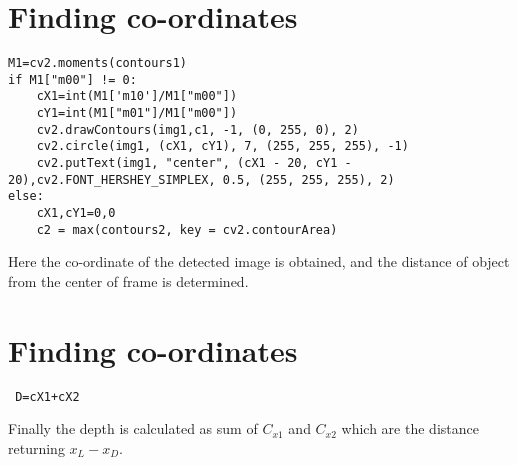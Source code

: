 \section{Finding co-ordinates}
\begin{lstlisting}
M1=cv2.moments(contours1)
if M1["m00"] != 0:
	cX1=int(M1['m10']/M1["m00"])
	cY1=int(M1["m01"]/M1["m00"])
	cv2.drawContours(img1,c1, -1, (0, 255, 0), 2)
	cv2.circle(img1, (cX1, cY1), 7, (255, 255, 255), -1)
	cv2.putText(img1, "center", (cX1 - 20, cY1 - 20),cv2.FONT_HERSHEY_SIMPLEX, 0.5, (255, 255, 255), 2)
else:
	cX1,cY1=0,0
	c2 = max(contours2, key = cv2.contourArea)
\end{lstlisting}
Here the co-ordinate of the detected image is obtained, and the distance of object from the center of frame is determined.

\section{Finding co-ordinates}
\begin{lstlisting}
 D=cX1+cX2
\end{lstlisting}
Finally the depth is calculated as sum of $C_{x1}$ and $C_{x2}$ which are the distance returning $x_{L}-x_{D}$.



